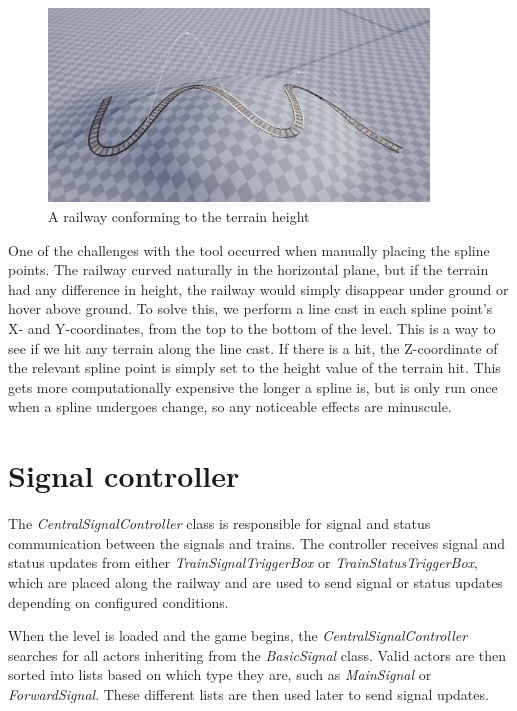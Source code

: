 \begin{figure}[h]
    \centerline{\includegraphics[width=0.9\textwidth]{figures/Spline2.png}}
    \caption{A railway conforming to the terrain height}
\end{figure} 

One of the challenges with the tool occurred when manually placing the spline points. The railway curved naturally in the horizontal plane, but if the terrain had any difference in height, the railway would simply disappear under ground or hover above ground. To solve this, we perform a line cast in each spline point's X- and Y-coordinates, from the top to the bottom of the level. This is a way to see if we hit any terrain along the line cast. If there is a hit, the Z-coordinate of the relevant spline point is simply set to the height value of the terrain hit. This gets more computationally expensive the longer a spline is, but is only run once when a spline undergoes change, so any noticeable effects are minuscule. 


\section{Signal controller}

The \textit{CentralSignalController} class is responsible for signal and status communication between the signals and trains. The controller receives signal and status updates from either \textit{TrainSignalTriggerBox} or \textit{TrainStatusTriggerBox}, which are placed along the railway and are used to send signal or status updates depending on configured conditions. 

When the level is loaded and the game begins, the \textit{CentralSignalController} searches for all actors inheriting from the \textit{BasicSignal} class. Valid actors are then sorted into lists based on which type they are, such as \textit{MainSignal} or \textit{ForwardSignal}. These different lists are then used later to send signal updates. 

